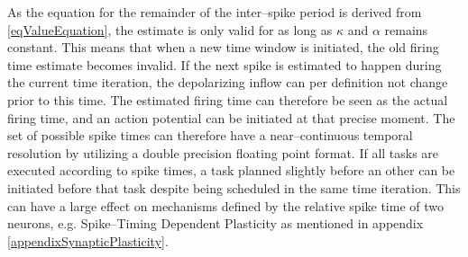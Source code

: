 	As the equation for the remainder of the inter--spike period is derived from \eqref{eqValueEquation}, the estimate is only valid for as long as $\kappa$ and $\alpha$ remains constant.
	This means that when a new time window is initiated, the old firing time estimate becomes invalid.
	If the next spike is estimated to happen during the current time iteration, the depolarizing inflow can per definition not change prior to this time. %
	The estimated firing time can therefore be seen as the actual firing time, and an action potential can be initiated at that precise moment.
	The set of possible spike times can therefore have a near--continuous temporal resolution by utilizing a double precision floating point format. 
	If all tasks are executed according to spike times, a task planned slightly before an other can be initiated before that task despite being scheduled in the same time iteration.
	This can have a large effect on mechanisms defined by the relative spike time of two neurons, e.g. Spike--Timing Dependent Plasticity as mentioned in appendix \ref{appendixSynapticPlasticity}.

